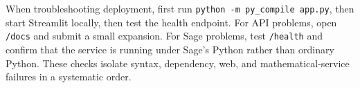 \documentclass[11pt]{article}
\begin{document}
When troubleshooting deployment, first run \texttt{python -m py\_compile app.py}, then start Streamlit locally, then test the health endpoint. For API problems, open \texttt{/docs} and submit a small expansion. For Sage problems, test \texttt{/health} and confirm that the service is running under Sage's Python rather than ordinary Python. These checks isolate syntax, dependency, web, and mathematical-service failures in a systematic order.

\newpage
\end{document}
